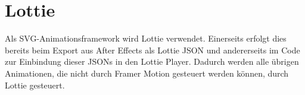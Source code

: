 \section{Lottie}
Als SVG-Animationsframework wird Lottie verwendet. Einerseits erfolgt dies bereits beim Export aus After Effects als Lottie JSON und andererseits im Code zur Einbindung dieser JSONs in den Lottie Player. Dadurch werden alle übrigen Animationen, die nicht durch Framer Motion gesteuert werden können, durch Lottie gesteuert.  


